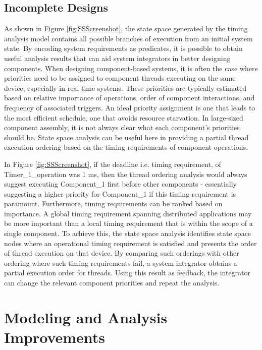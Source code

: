\subsection{Incomplete Designs}

As shown in Figure \ref{fig:SSScreenshot}, the state space generated by the timing analysis model contains all possible branches of execution from an initial system state. By encoding system requirements as predicates, it is possible to obtain useful analysis results that can aid system integrators in better designing components. When designing component-based systems, it is often the case where priorities need to be assigned to component threads executing on the same device, especially in real-time systems. These priorities are typically estimated based on relative importance of operations, order of component interactions, and frequency of associated triggers. An ideal priority assignment is one that leads to the most efficient schedule, one that avoids resource starvation. In large-sized component assembly, it is not always clear what each component's priorities should be. State space analysis can be useful here in providing a partial thread execution ordering based on the timing requirements of component operations. 

In Figure \ref{fig:SSScreenshot}, if the deadline i.e. timing requirement, of Timer\_1\_operation was 1 ms, then the thread ordering analysis would always suggest executing Component\_1 first before other components - essentially suggesting a higher priority for Component\_1 if this timing requirement is paramount. Furthermore, timing requirements can be ranked based on importance. A global timing requirement spanning distributed applications may be more important than a local timing requirement that is within the scope of a single component. To achieve this, the state space analysis identifies state space nodes where an operational timing requirement is satisfied and presents the order of thread execution on that device. By comparing such orderings with other ordering where such timing requirements fail, a system integrator obtains a partial execution order for threads. Using this result as feedback, the integrator can change the relevant component priorities and repeat the analysis. 


\section{Modeling and Analysis Improvements}
\label{sec:Improvements}

